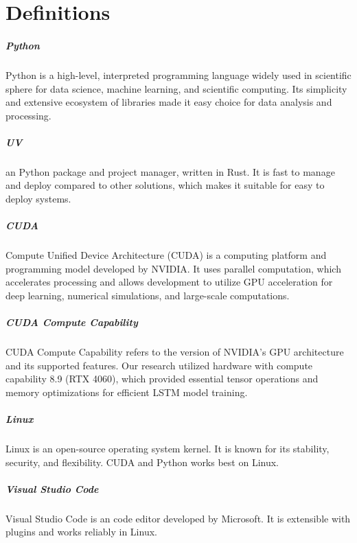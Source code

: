 \chapter{Definitions}
\label{chap:definitions}
\setlength{\parskip}{1em}

\paragraph{Python} Python is a high-level, interpreted programming language widely used in scientific sphere for data science, machine learning, and scientific computing. Its simplicity and extensive ecosystem of libraries made it easy choice for data analysis and processing.

\paragraph{UV} an Python package and project manager, written in Rust. It is fast to manage and deploy compared to other solutions, which makes it suitable for easy to deploy systems.

\paragraph{CUDA} Compute Unified Device Architecture (CUDA) is a computing platform and programming model developed by NVIDIA. It uses parallel computation, which accelerates processing and allows development to utilize GPU acceleration for deep learning, numerical simulations, and large-scale computations.

\paragraph{CUDA Compute Capability} CUDA Compute Capability refers to the version of NVIDIA's GPU architecture and its supported features. Our research utilized hardware with compute capability 8.9 (RTX 4060), which provided essential tensor operations and memory optimizations for efficient LSTM model training.

\paragraph{Linux} Linux is an open-source operating system kernel. It is known for its stability, security, and flexibility. CUDA and Python works best on Linux.

\paragraph{Visual Studio Code} Visual Studio Code is an code editor developed by Microsoft. It is extensible with plugins and works reliably in Linux. 

